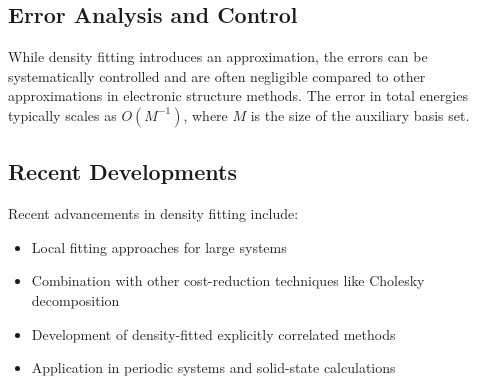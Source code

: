 \subsection{Error Analysis and Control}

While density fitting introduces an approximation, the errors can be systematically controlled and are often negligible compared to other approximations in electronic structure methods. The error in total energies typically scales as $O(M^{-1})$, where $M$ is the size of the auxiliary basis set.

\subsection{Recent Developments}

Recent advancements in density fitting include:

\begin{itemize}
    \item Local fitting approaches for large systems
    \item Combination with other cost-reduction techniques like Cholesky decomposition
    \item Development of density-fitted explicitly correlated methods
    \item Application in periodic systems and solid-state calculations
\end{itemize}